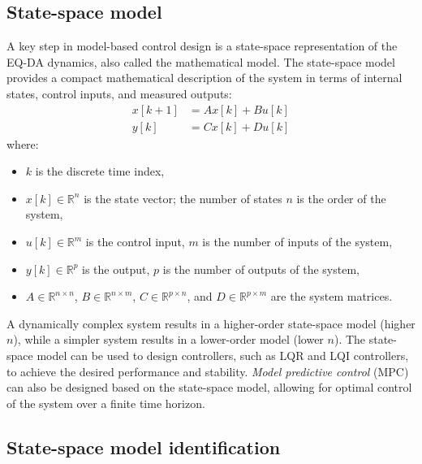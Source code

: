 \documentclass[12pt,a4paper]{article}
\begin{document}
\subsection{State-space model}
A key step in model-based control design is a state-space representation of the EQ-DA dynamics, also called the mathematical model. The state-space model provides a compact mathematical description of the system in terms of internal states, control inputs, and measured outputs:
\begin{equation}
\begin{aligned}
x[k+1] &= Ax[k] + Bu[k] \\
y[k] &= Cx[k] + Du[k]
\end{aligned}
\label{eq:ss}
\end{equation}
where:
\begin{itemize}
    \item $k$ is the discrete time index,
    \item $x[k] \in \mathbb{R}^{n}$ is the state vector; the number of states $n$ is the order of the system,
    \item $u[k] \in \mathbb{R}^{m}$ is the control input, $m$ is the number of inputs of the system,
    \item $y[k] \in \mathbb{R}^{p}$ is the output, $p$ is the number of outputs of the system,
    \item $A \in \mathbb{R}^{n \times n}$, $B \in \mathbb{R}^{n \times m}$, $C \in \mathbb{R}^{p \times n}$, and $D \in \mathbb{R}^{p \times m}$ are the system matrices.
\end{itemize}
A dynamically complex system results in a higher-order state-space model (higher $n$), while a simpler system results in a lower-order model (lower $n$). The state-space model can be used to design controllers, such as LQR and LQI controllers, to achieve the desired performance and stability. \textit{Model predictive control} (MPC) can also be designed based on the state-space model, allowing for optimal control of the system over a finite time horizon.

\subsection{State-space model identification}
\end{document}
